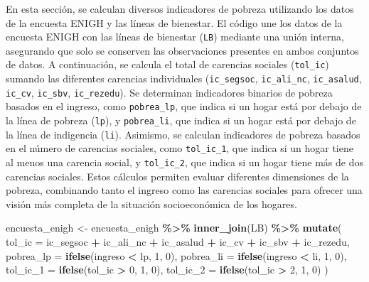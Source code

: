 \documentclass[
  12pt,
]{book}
\newenvironment{Shaded}{\begin{snugshade}}{\end{snugshade}}
\newcommand{\AttributeTok}[1]{\textcolor[rgb]{0.13,0.29,0.53}{#1}}
\newcommand{\DecValTok}[1]{\textcolor[rgb]{0.00,0.00,0.81}{#1}}
\newcommand{\FunctionTok}[1]{\textcolor[rgb]{0.13,0.29,0.53}{\textbf{#1}}}
\newcommand{\NormalTok}[1]{#1}
\newcommand{\OtherTok}[1]{\textcolor[rgb]{0.56,0.35,0.01}{#1}}
\newcommand{\SpecialCharTok}[1]{\textcolor[rgb]{0.81,0.36,0.00}{\textbf{#1}}}
\begin{document}
En esta sección, se calculan diversos indicadores de pobreza utilizando los datos de la encuesta ENIGH y las líneas de bienestar. El código une los datos de la encuesta ENIGH con las líneas de bienestar (\texttt{LB}) mediante una unión interna, asegurando que solo se conserven las observaciones presentes en ambos conjuntos de datos. A continuación, se calcula el total de carencias sociales (\texttt{tol\_ic}) sumando las diferentes carencias individuales (\texttt{ic\_segsoc}, \texttt{ic\_ali\_nc}, \texttt{ic\_asalud}, \texttt{ic\_cv}, \texttt{ic\_sbv}, \texttt{ic\_rezedu}). Se determinan indicadores binarios de pobreza basados en el ingreso, como \texttt{pobrea\_lp}, que indica si un hogar está por debajo de la línea de pobreza (\texttt{lp}), y \texttt{pobrea\_li}, que indica si un hogar está por debajo de la línea de indigencia (\texttt{li}). Asimismo, se calculan indicadores de pobreza basados en el número de carencias sociales, como \texttt{tol\_ic\_1}, que indica si un hogar tiene al menos una carencia social, y \texttt{tol\_ic\_2}, que indica si un hogar tiene más de dos carencias sociales. Estos cálculos permiten evaluar diferentes dimensiones de la pobreza, combinando tanto el ingreso como las carencias sociales para ofrecer una visión más completa de la situación socioeconómica de los hogares.

\begin{Shaded}
\begin{Highlighting}[]
\NormalTok{encuesta\_enigh }\OtherTok{\textless{}{-}}\NormalTok{ encuesta\_enigh }\SpecialCharTok{\%\textgreater{}\%} \FunctionTok{inner\_join}\NormalTok{(LB) }\SpecialCharTok{\%\textgreater{}\%}
\FunctionTok{mutate}\NormalTok{(}
\AttributeTok{tol\_ic =}\NormalTok{ ic\_segsoc }\SpecialCharTok{+}\NormalTok{ ic\_ali\_nc }\SpecialCharTok{+}\NormalTok{ ic\_asalud }\SpecialCharTok{+}\NormalTok{ ic\_cv }\SpecialCharTok{+}\NormalTok{ ic\_sbv }\SpecialCharTok{+}\NormalTok{ ic\_rezedu,}
\AttributeTok{pobrea\_lp =} \FunctionTok{ifelse}\NormalTok{(ingreso }\SpecialCharTok{\textless{}}\NormalTok{ lp, }\DecValTok{1}\NormalTok{, }\DecValTok{0}\NormalTok{),}
\AttributeTok{pobrea\_li =} \FunctionTok{ifelse}\NormalTok{(ingreso }\SpecialCharTok{\textless{}}\NormalTok{ li, }\DecValTok{1}\NormalTok{, }\DecValTok{0}\NormalTok{),}
\AttributeTok{tol\_ic\_1 =} \FunctionTok{ifelse}\NormalTok{(tol\_ic }\SpecialCharTok{\textgreater{}} \DecValTok{0}\NormalTok{, }\DecValTok{1}\NormalTok{, }\DecValTok{0}\NormalTok{),}
\AttributeTok{tol\_ic\_2 =} \FunctionTok{ifelse}\NormalTok{(tol\_ic }\SpecialCharTok{\textgreater{}} \DecValTok{2}\NormalTok{, }\DecValTok{1}\NormalTok{, }\DecValTok{0}\NormalTok{)}
\NormalTok{)}
\end{Highlighting}
\end{Shaded}
\end{document}
